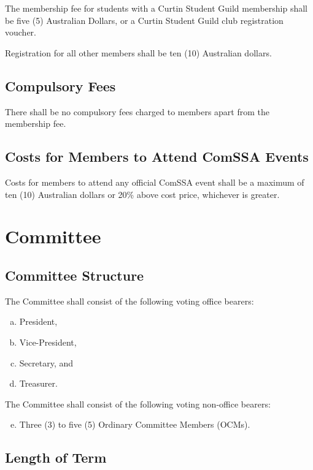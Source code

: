 \documentclass[a4paper,12pt]{article}
\begin{document}
The membership fee for students with a Curtin Student Guild membership shall be five (5) Australian Dollars, or a Curtin Student Guild club registration voucher.

Registration for all other members shall be ten (10) Australian dollars.

\subsection{Compulsory Fees}

There shall be no compulsory fees charged to members apart from the membership fee.

\subsection{Costs for Members to Attend ComSSA Events}

Costs for members to attend any official ComSSA event shall be a maximum of ten (10) Australian dollars or 20\% above cost price, whichever is greater.

\section{Committee}

\subsection{Committee Structure}

The Committee shall consist of the following voting office bearers:

\begin{enumerate}[a)]
	\item President,
	\item Vice-President,
	\item Secretary, and
	\item Treasurer.
\end{enumerate}

The Committee shall consist of the following voting non-office bearers:

\begin{enumerate}[a)]
	\setcounter{enumi}{4}
	\item Three (3) to five (5) Ordinary Committee Members (OCMs).
\end{enumerate}

\subsection{Length of Term}
\end{document}
